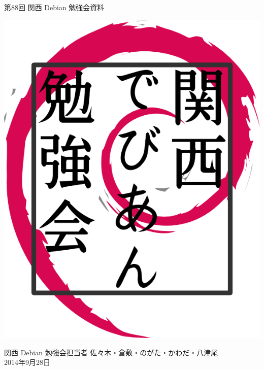 \documentclass[mingoth,a4paper]{jsarticle}
\newcommand{\debmtgyear}{2014}
\newcommand{\debmtgdate}{28}
\newcommand{\debmtgmonth}{9}
\newcommand{\debmtgnumber}{88}
\begin{document}
\begin{titlepage}


 第\debmtgnumber{}回 関西 Debian 勉強会資料

\vspace{2cm}

\begin{center}
\includegraphics{image200802/kansaidebianlogo.png}
\end{center}

\begin{flushright}
\hfill{}関西 Debian 勉強会担当者 佐々木・倉敷・のがた・かわだ・八津尾 \\
\hfill{}\debmtgyear{}年\debmtgmonth{}月\debmtgdate{}日
\end{flushright}

\thispagestyle{empty}
\end{titlepage}


\vspace{1em}
\end{document}
